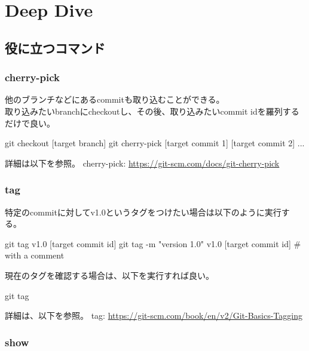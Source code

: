 \documentclass[10pt,a4j,openany,dvipdfmx]{jsarticle}
\begin{document}
\section{Deep Dive} %
\label{sec:Deep Dive}


\subsection{役に立つコマンド} %
\label{sub:役に立つコマンド}


\subsubsection{cherry-pick} %
\label{ssub:cherry_pick}

他のブランチなどにあるcommitも取り込むことができる。\\
取り込みたいbranchにcheckoutし、その後、取り込みたいcommit idを羅列するだけで良い。
\begin{commandshell}
git checkout [target branch]
git cherry-pick [target commit 1] [target commit 2] ...
\end{commandshell}

詳細は以下を参照。
cherry-pick: \url{https://git-scm.com/docs/git-cherry-pick}

\subsubsection{tag} %
\label{ssub:tag}

特定のcommitに対してv1.0というタグをつけたい場合は以下のように実行する。
\begin{commandshell}
git tag v1.0 [target commit id]
git tag -m "version 1.0" v1.0 [target commit id]   # with a comment
\end{commandshell}

現在のタグを確認する場合は、以下を実行すれば良い。
\begin{commandshell}
git tag
\end{commandshell}

詳細は、以下を参照。
tag: \url{https://git-scm.com/book/en/v2/Git-Basics-Tagging}

\subsubsection{show} %
\label{ssub:show}
\end{document}
